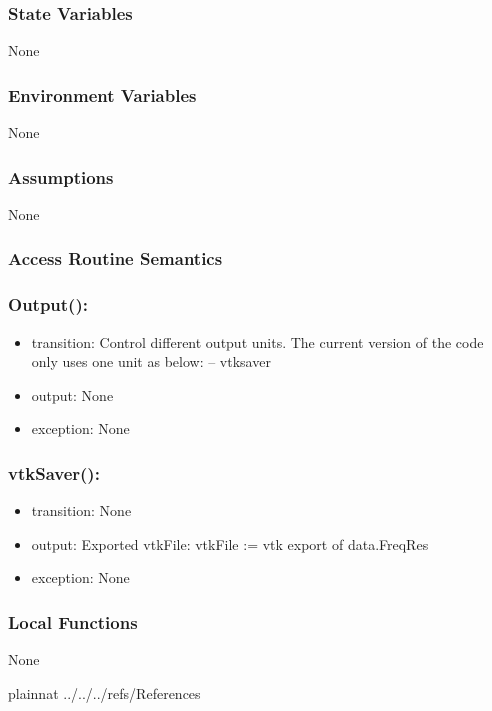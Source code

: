 \documentclass[12pt, titlepage]{article}
\begin{document}
	\subsubsection{State Variables} None
	
	\subsubsection{Environment Variables} None
	
	\subsubsection{Assumptions} None
	
	\subsubsection{Access Routine Semantics}
	
	\subsubsection*{Output():} \begin{itemize} \item transition: Control different
		output units. The current version of the code only uses one unit as below:
		\subitem -- vtksaver \item output: None \item exception: None \end{itemize}
	
	\subsubsection*{vtkSaver():} \begin{itemize} \item transition: None \item
		output: Exported vtkFile: \subitem vtkFile := vtk export of data.FreqRes \item
		exception: None \end{itemize}
	
	\subsubsection{Local Functions} None
	
	\newpage %
	
	
	 {plainnat}  {../../../refs/References}
	
	
	
\end{document}
